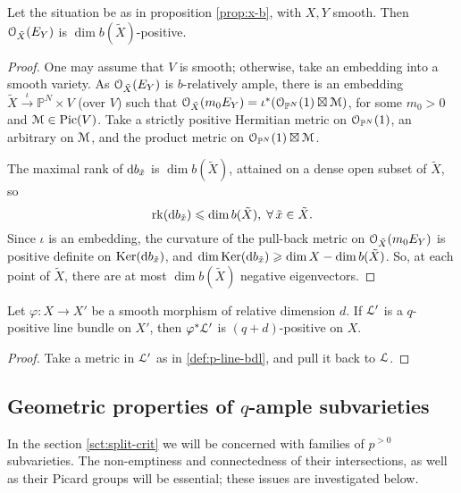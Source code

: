 \documentclass[11pt,reqno]{amsart}
\let\euf\EuScript
\let\mbb\mathbb
\let\tld\tilde
\let\srel\stackrel
\let\vphi\varphi
\numberwithin{equation}{section}
\numberwithin{figure}{section}
\let\ges\geqslant
\let\les\leqslant
\begin{document}
\begin{m-proposition}\label{prop:+}
Let the situation be as in proposition \ref{prop:x-b}, with $X,Y$ smooth. 
Then ${{\euf O}}_{\tld X}(E_Y)$ is $\dim b(\tld X)$-positive. 
\end{m-proposition}

\begin{proof}
One may assume that $V$ is smooth; otherwise, take an embedding into a smooth variety. 
As ${{\euf O}}_{\tld X}(E_Y)$ is $b$-relatively ample, there is an embedding 
$\tld X\srel{\iota}{\to}\mbb P^N\times V$ (over $V$) such that 
${{\euf O}}_{\tld X}(m_0E_Y)=\iota^*({{\euf O}}_{\mbb P^N}(1)\boxtimes\euf M)$, 
for some $m_0>0$ and $\euf M\in{\mathop{\rm Pic}\nolimits}(V)$. 
Take a strictly positive Hermitian metric on ${{\euf O}}_{\mbb P^N}(1)$, an arbitrary 
on $\euf M$, and the product metric on ${{\euf O}}_{\mbb P^N}(1)\boxtimes\euf M$. 

The maximal rank of ${{\rm d}} b_{\tld x}$ is $\dim b(\tld X)$, attained on a dense open 
subset of $\tld X$, so 
$$
{{\rm rk}}({{\rm d}} b_{\tld x})\les\dim b(\tld X),\;\forall\,\tld x\in\tld X.
$$ 
Since $\iota$ is an embedding, the curvature of the pull-back metric on 
${{\euf O}}_{\tld X}(m_0E_Y)$ is positive definite on ${{\rm Ker}}({{\rm d}} b_{\tld x})$, and 
$\dim{{\rm Ker}}({{\rm d}} b_{\tld x})\ges\dim X-\dim b(\tld X)$. 
So, at each point of $\tld X$, there are at most $\dim b(\tld X)$ negative eigenvectors. 
\end{proof}

\begin{m-lemma}\label{lm:pull-back-smooth}
Let $\vphi:X\to X'$ be a smooth morphism of relative dimension $d$. If ${{\euf L}}'$ is 
a $q$-positive line bundle on $X'$, then $\vphi^*{{\euf L}}'$ is $(q+d)$-positive on $X$. 
\end{m-lemma}

\begin{proof}
Take a metric in ${{\euf L}}'$ as in \ref{def:p-line-bdl}, and pull it back to ${{\euf L}}$. 
\end{proof}

\subsection{Geometric properties of $q$-ample subvarieties}\label{ssct:geom}

In the section \ref{sct:split-crit} we will be concerned with families of $p^{{>0}}$ subvarieties. 
The non-emptiness and connectedness of their intersections, as well as 
their Picard groups will be essential; these issues are investigated below. 
\end{document}
